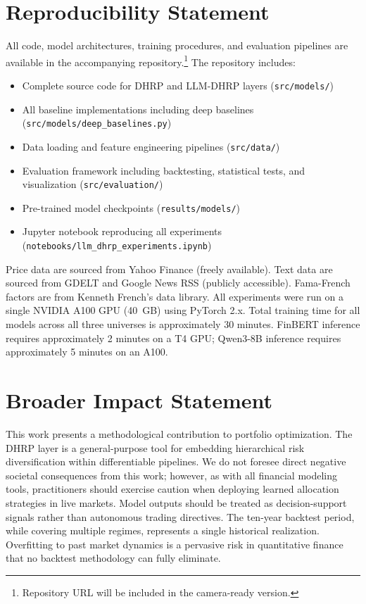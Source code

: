 \documentclass{article}
\begin{document}
\section{Reproducibility Statement}
\label{app:reproducibility}

All code, model architectures, training procedures, and evaluation pipelines are available in the accompanying repository.\footnote{Repository URL will be included in the camera-ready version.} The repository includes:
\begin{itemize}
\item Complete source code for DHRP and LLM-DHRP layers (\texttt{src/models/})
\item All baseline implementations including deep baselines (\texttt{src/models/deep\_baselines.py})
\item Data loading and feature engineering pipelines (\texttt{src/data/})
\item Evaluation framework including backtesting, statistical tests, and visualization (\texttt{src/evaluation/})
\item Pre-trained model checkpoints (\texttt{results/models/})
\item Jupyter notebook reproducing all experiments (\texttt{notebooks/llm\_dhrp\_experiments.ipynb})
\end{itemize}

Price data are sourced from Yahoo Finance (freely available). Text data are sourced from GDELT and Google News RSS (publicly accessible). Fama-French factors are from Kenneth French's data library. All experiments were run on a single NVIDIA A100 GPU (40~GB) using PyTorch 2.x. Total training time for all models across all three universes is approximately 30 minutes. FinBERT inference requires approximately 2 minutes on a T4 GPU; Qwen3-8B inference requires approximately 5 minutes on an A100.

\section{Broader Impact Statement}
\label{app:impact}

This work presents a methodological contribution to portfolio optimization. The DHRP layer is a general-purpose tool for embedding hierarchical risk diversification within differentiable pipelines. We do not foresee direct negative societal consequences from this work; however, as with all financial modeling tools, practitioners should exercise caution when deploying learned allocation strategies in live markets. Model outputs should be treated as decision-support signals rather than autonomous trading directives. The ten-year backtest period, while covering multiple regimes, represents a single historical realization. Overfitting to past market dynamics is a pervasive risk in quantitative finance that no backtest methodology can fully eliminate.
\end{document}
